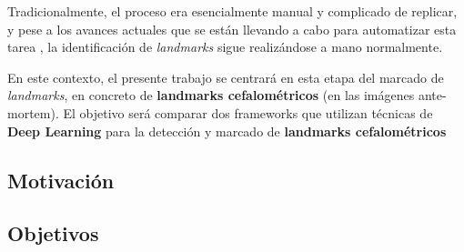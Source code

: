 \medskip

\noindent Tradicionalmente, el proceso era esencialmente manual y complicado de replicar, y pese a los avances actuales que se están llevando a cabo para automatizar esta tarea \cite{Huete2015PastPA}, la identificación de \textit{landmarks} sigue realizándose a mano normalmente. 

\medskip

\noindent En este contexto, el presente trabajo se centrará en esta etapa del marcado de \textit{landmarks}, en concreto de \textbf{landmarks cefalométricos} (en las imágenes ante-mortem). El objetivo será comparar dos frameworks que utilizan técnicas de \textbf{Deep Learning} para la detección y marcado de \textbf{landmarks cefalométricos}  
\subsection{Motivación}
\subsection{Objetivos}




\endinput


